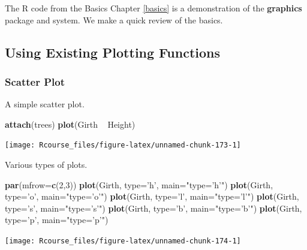 \documentclass[]{book}
\newenvironment{Shaded}{\begin{snugshade}}{\end{snugshade}}
\newcommand{\KeywordTok}[1]{\textcolor[rgb]{0.13,0.29,0.53}{\textbf{{#1}}}}
\newcommand{\DataTypeTok}[1]{\textcolor[rgb]{0.13,0.29,0.53}{{#1}}}
\newcommand{\DecValTok}[1]{\textcolor[rgb]{0.00,0.00,0.81}{{#1}}}
\newcommand{\StringTok}[1]{\textcolor[rgb]{0.31,0.60,0.02}{{#1}}}
\newcommand{\NormalTok}[1]{{#1}}
\theoremstyle{definition}
\theoremstyle{definition}
\theoremstyle{remark}
\begin{document}
The R code from the Basics Chapter \ref{basics} is a demonstration of
the \textbf{graphics} package and system. We make a quick review of the
basics.

\subsection{Using Existing Plotting
Functions}\label{using-existing-plotting-functions}

\subsubsection{Scatter Plot}\label{scatter-plot}

A simple scatter plot.

\begin{Shaded}
\begin{Highlighting}[]
\KeywordTok{attach}\NormalTok{(trees)}
\KeywordTok{plot}\NormalTok{(Girth ~}\StringTok{ }\NormalTok{Height)}
\end{Highlighting}
\end{Shaded}

\texttt{[image: Rcourse\_files/figure-latex/unnamed-chunk-173-1]}

Various types of plots.

\begin{Shaded}
\begin{Highlighting}[]
\KeywordTok{par}\NormalTok{(}\DataTypeTok{mfrow=}\KeywordTok{c}\NormalTok{(}\DecValTok{2}\NormalTok{,}\DecValTok{3}\NormalTok{))}
\KeywordTok{plot}\NormalTok{(Girth, }\DataTypeTok{type=}\StringTok{'h'}\NormalTok{, }\DataTypeTok{main=}\StringTok{"type='h'"}\NormalTok{) }
\KeywordTok{plot}\NormalTok{(Girth, }\DataTypeTok{type=}\StringTok{'o'}\NormalTok{, }\DataTypeTok{main=}\StringTok{"type='o'"}\NormalTok{) }
\KeywordTok{plot}\NormalTok{(Girth, }\DataTypeTok{type=}\StringTok{'l'}\NormalTok{, }\DataTypeTok{main=}\StringTok{"type='l'"}\NormalTok{)}
\KeywordTok{plot}\NormalTok{(Girth, }\DataTypeTok{type=}\StringTok{'s'}\NormalTok{, }\DataTypeTok{main=}\StringTok{"type='s'"}\NormalTok{)}
\KeywordTok{plot}\NormalTok{(Girth, }\DataTypeTok{type=}\StringTok{'b'}\NormalTok{, }\DataTypeTok{main=}\StringTok{"type='b'"}\NormalTok{)}
\KeywordTok{plot}\NormalTok{(Girth, }\DataTypeTok{type=}\StringTok{'p'}\NormalTok{, }\DataTypeTok{main=}\StringTok{"type='p'"}\NormalTok{)}
\end{Highlighting}
\end{Shaded}

\texttt{[image: Rcourse\_files/figure-latex/unnamed-chunk-174-1]}
\end{document}
